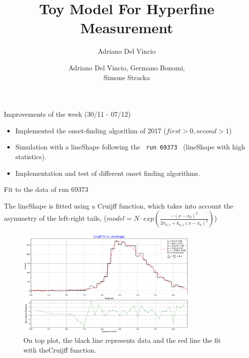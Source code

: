 \documentclass[8pt]{beamer}
\author{Adriano Del Vincio}
\title[Alpha 2]{Toy Model For Hyperfine Measurement}
\author[Adriano, Germano, Simone]{Adriano Del Vincio, Germano Bonomi,\\ Simone Stracka}
\institute[]{University of Brescia, INFN Pisa}
\begin{document}
\begin{frame}
\titlepage
\end{frame}

\begin{frame}{ Improvements of the week (30/11 - 07/12)}
\begin{itemize}
\item Implemented the onset-finding algorithm of 2017 ($first > 0 , second > 1$)
\item Simulation with a lineShape following the \texttt{ run 69373 } (lineShape with high statistics).
\item Implementation and test of different onset finding algorithms.
\end{itemize}
\end{frame}

\begin{frame}{Fit to the data of run 69373}

The lineShape is fitted using a Cruijff function, which takes into account the asymmetry of the left-right tails, ($model = N \cdot exp(  \frac{-(x - x_{0})^2}{2\sigma_{0,1} + k_{0,1}(x - x_{0})^{2}})$) 

\begin{figure}[hbtp]
\centering
\includegraphics[width = 0.8\textwidth ]{../Plot/FitToLineShape.pdf}
\caption{On top plot, the black line represents data and the red line the fit with the\newline Cruijff function.}
\end{figure}
\end{frame}
\end{document}
